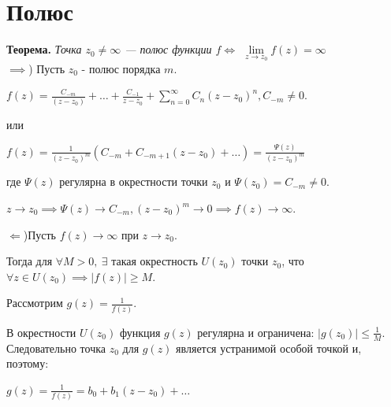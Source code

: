 \documentclass[a4paper, 12pt]{report}
\begin{document}
\section{Полюс}
	\textbf{Теорема.} \quad
	\textit{Точка $z_0 \neq \infty$ --- полюс функции $f \iff$  $\lim\limits_{z \to z_0}f(z) = \infty$} \\
	\blacklozenge \hspace{3 mm} 
		$\implies$) \quad Пусть $z_0$ - полюс порядка $m$. 
		\begin{center}
		    $f(z) = \frac{C_{-m}}{(z - z_0)} + \dots + \frac{C_{-1}}{z - z_0} + \sum\limits_{n = 0}^{\infty} C_n(z - z_0)^n, C_{-m} \neq 0.$
		\end{center}
		\par или \begin{center}
		    $f(z) = \frac{1}{(z - z_0)^m}(C_{-m} + C_{-m+1}(z - z_0)+ \dots) = \frac{\Psi(z)}{(z -z_0)^m}$
		\end{center}\par где $\Psi(z)$ регулярна в окрестности точки $z_0$ и $\Psi(z_0) = C_{-m} \neq 0$. \par{} $z \to z_0 \implies \Psi (z) \to C_{-m}, (z -z_0)^m \to 0 \implies f(z) \longrightarrow \infty $.
		\par\bigskip
		$\Longleftarrow$)\quad Пусть $f(z) \longrightarrow \infty$ при $z \to z_0$. \par\bigskip Тогда для $\forall M > 0, \ \exists$ такая окрестность $U(z_0)$ точки $z_0$, что $\forall z \in U(z_0)  \implies |f(z)| \geq M$.
		\par\bigskip Рассмотрим $g(z) = \frac{1}{f(z)}$.
		\par\bigskip В окрестности $U(z_0)$ функция $g(z)$ регулярна и ограничена: $|g(z_0)| \leq \frac{1}{M}$. Следовательно точка $z_0$ для $g(z)$ является устранимой особой точкой и, поэтому:
		\begin{center}
		    $g(z) = \frac{1}{f(z)} = b_0 + b_1(z - z_0) + \dots$
		\end{center}
		
\end{document}
